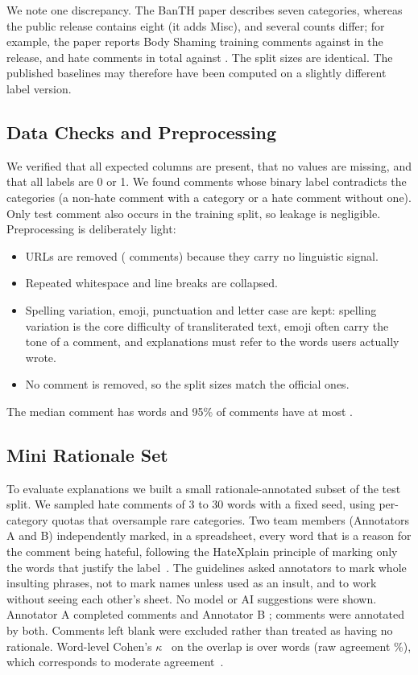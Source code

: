 \documentclass[conference,letterpaper,10pt]{IEEEtran}
\begin{document}
We note one discrepancy. The BanTH paper describes seven categories, whereas the public release contains eight (it adds Misc), and several counts differ; for example, the paper reports \paperBodyShamingTrain{} Body Shaming training comments against \bodyShamingTrain{} in the release, and \paperHateTotal{} hate comments in total against \nHateTotal. The split sizes are identical. The published baselines may therefore have been computed on a slightly different label version.

\subsection{Data Checks and Preprocessing}
We verified that all expected columns are present, that no values are missing, and that all labels are 0 or 1. We found \consistencyViolations{} comments whose binary label contradicts the categories (a non-hate comment with a category or a hate comment without one). Only \testInTrain{} test comment also occurs in the training split, so leakage is negligible. Preprocessing is deliberately light:
\begin{itemize}
\item URLs are removed (\urlRows{} comments) because they carry no linguistic signal.
\item Repeated whitespace and line breaks are collapsed.
\item Spelling variation, emoji, punctuation and letter case are kept: spelling variation is the core difficulty of transliterated text, emoji often carry the tone of a comment, and explanations must refer to the words users actually wrote.
\item No comment is removed, so the split sizes match the official ones.
\end{itemize}
The median comment has \medianWords{} words and 95\% of comments have at most \pNinetyFiveWords{}.

\subsection{Mini Rationale Set}
To evaluate explanations we built a small rationale-annotated subset of the test split. We sampled \ratSample{} hate comments of 3 to 30 words with a fixed seed, using per-category quotas that oversample rare categories. Two team members (Annotators A and B) independently marked, in a spreadsheet, every word that is a reason for the comment being hateful, following the HateXplain principle of marking only the words that justify the label~\cite{mathew2021hatexplain}. The guidelines asked annotators to mark whole insulting phrases, not to mark names unless used as an insult, and to work without seeing each other's sheet. No model or AI suggestions were shown. Annotator A completed \ratA{} comments and Annotator B \ratB; \ratBoth{} comments were annotated by both. Comments left blank were excluded rather than treated as having no rationale. Word-level Cohen's $\kappa$~\cite{cohen1960kappa} on the overlap is \kappaVal{} over \ratWords{} words (raw agreement \rawAgree\%), which corresponds to moderate agreement~\cite{landis1977agreement}.
\end{document}
